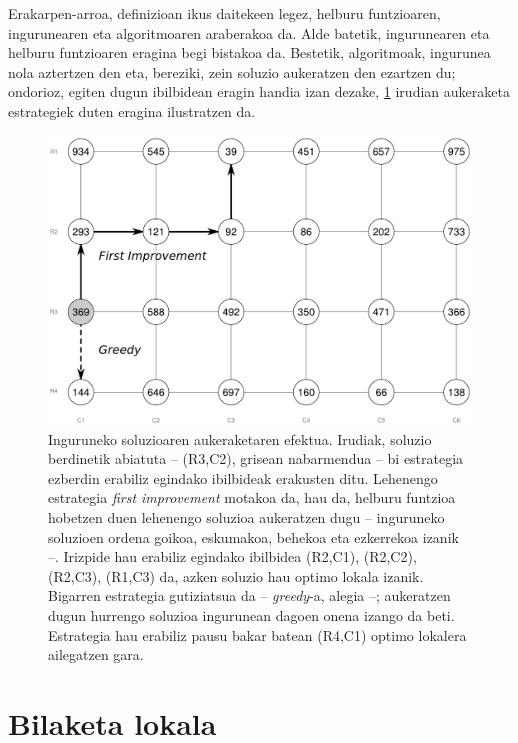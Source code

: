 \documentclass[eu]{ifirak}\usepackage[]{graphicx}\usepackage[]{color}
\begin{document}
Erakarpen-arroa, definizioan ikus daitekeen legez, helburu funtzioaren, ingurunearen eta algoritmoaren araberakoa da. Alde batetik, ingurunearen eta helburu funtzioaren eragina begi bistakoa da. Bestetik, algoritmoak, ingurunea nola aztertzen den eta, bereziki, zein soluzio aukeratzen den ezartzen du; ondorioz, egiten dugun ibilbidean eragin handia izan dezake, \ref{fig:ls_selection_effect} irudian aukeraketa estrategiek duten eragina ilustratzen da.

\begin{figure}[t]
\centering
\includegraphics[width=0.66\linewidth]{./Irudiak/ls_selection_effect}
\caption{Inguruneko soluzioaren aukeraketaren efektua. Irudiak, soluzio berdinetik abiatuta -- (R3,C2), grisean nabarmendua -- bi estrategia ezberdin erabiliz egindako ibilbideak erakusten ditu. Lehenengo estrategia \textit{first improvement} motakoa da, hau da, helburu funtzioa hobetzen duen lehenengo soluzioa aukeratzen dugu -- inguruneko soluzioen ordena goikoa, eskumakoa, behekoa eta ezkerrekoa izanik --. Irizpide hau erabiliz egindako ibilbidea (R2,C1), (R2,C2), (R2,C3), (R1,C3) da, azken soluzio hau optimo lokala izanik. Bigarren estrategia gutiziatsua da -- \textit{greedy}-a, alegia --; aukeratzen dugun hurrengo soluzioa ingurunean dagoen onena izango da beti. Estrategia hau erabiliz pausu bakar batean (R4,C1) optimo lokalera ailegatzen gara.}
\label{fig:ls_selection_effect}
\end{figure}

\section{Bilaketa lokala}
\end{document}
